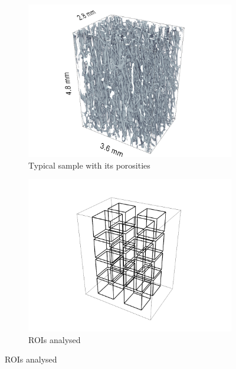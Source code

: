\documentclass[a4paper,fleqn]{DC_ArtStyle}
\begin{document}
	\begin{figure}[!h]
		\centering
		\begin{subfigure}[t]{.45\linewidth}
			\includegraphics[height=0.8\linewidth]{../Results/Scans/2009_213_L}
			\caption{Typical sample with its porosities}
		\end{subfigure}
		\begin{subfigure}[t]{0.45\linewidth}
			\includegraphics[height=0.8\linewidth, trim=50 50 50 0]{../Results/ROIs/ROIs}
			\caption{ROIs analysed}
		\end{subfigure}
	\end{figure}
\end{document}
